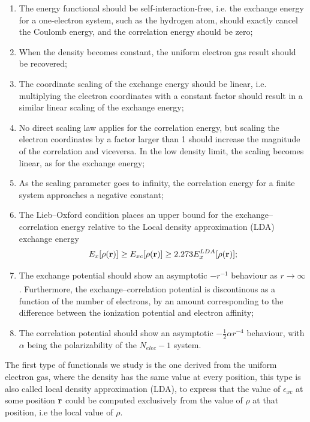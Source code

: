 \begin{enumerate}
    \item The energy functional should be self-interaction-free, i.e. the exchange energy for a one-electron system, such as the hydrogen atom, should exactly cancel the Coulomb energy, and the correlation energy should be zero;
    \item When the density becomes constant, the uniform electron gas result should be recovered;
    \item The coordinate scaling of the exchange energy should be linear, i.e. multiplying the electron coordinates with a constant factor should result in a similar linear scaling of the exchange energy;
    \item No direct scaling law applies for the correlation energy, but scaling the electron coordinates by a factor larger than 1 should increase the magnitude of the correlation and viceversa. In the low density limit, the scaling becomes linear, as for the exchange energy;
    \item As the scaling parameter goes to infinity, the correlation energy for a finite system approaches a negative constant;
    \item The Lieb–Oxford condition places an upper bound for the exchange–correlation energy relative to the Local density approximation (LDA) exchange energy
    \begin{equation}
        E_x[\rho({\bf r})] \geq E_{xc}[\rho({\bf r})] \geq 2.273 E_x^{LDA}[\rho({\bf r})];
    \end{equation}
    \item The exchange potential should show an asymptotic $-r^{-1}$ behaviour as $r \xrightarrow[]{} \infty$. Furthermore, the exchange–correlation potential is discontinous as a function of the number of electrons, by an amount corresponding to the difference between the ionization potential and electron affinity;
    \item The correlation potential should show an asymptotic $-\frac{1}{2} \alpha r^{-4}$ behaviour, with $\alpha$ being the polarizability of the $N_{elec} - 1$ system.
\end{enumerate}
The first type of functionals we study is the one derived from the uniform electron gas, where the density has the same value at every position, this type is also called local density approximation (LDA), to express that the value of $\epsilon_{xc}$ at some position ${\bf r}$ could be computed exclusively from the value of $\rho$ at that position, i.e the local value of $\rho$. \\
